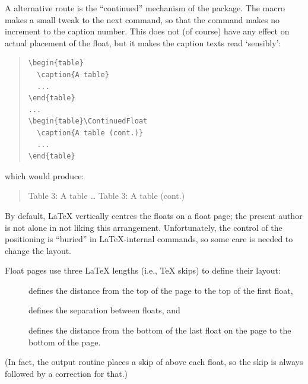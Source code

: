 A alternative route is the ``continued'' mechanism of the
 package.  The  macro makes a
small tweak to the next  command, so that the command
makes no increment to the caption number.  This does not (of course)
have any effect on actual placement of the float, but it makes the
caption texts read `sensibly':
\begin{quote}
\begin{verbatim}
\begin{table}
  \caption{A table}
  ...
\end{table}
...
\begin{table}\ContinuedFloat
  \caption{A table (cont.)}
  ...
\end{table}
\end{verbatim}
\end{quote}
which would produce:
\begin{quote}
  Table 3: A table
  \dots
  Table 3: A table (cont.)
\end{quote}
\begin{ctanrefs}
\item[caption.sty]
\item[dpfloat.sty]
\item[fltpage.sty]
\end{ctanrefs}


By default, \LaTeX{} vertically centres the floats on a float page;
the present author is not alone in not liking this arrangement.
Unfortunately, the control of the positioning is ``buried'' in
\LaTeX{}-internal commands, so some care is needed to change the
layout.

Float pages use three \LaTeX{} lengths (i.e., \TeX{} skips) to define
their layout:
\begin{description}
\item[\nothtml{\normalfont}] defines the distance from the
  top of the page to the top of the first float,
\item[\nothtml{\normalfont}] defines the separation between
  floats, and
\item[\nothtml{\normalfont}] defines the distance from the
  bottom of the last float on the page to the bottom of the page.
\end{description}
(In fact, the output routine places a skip of  above each float, so
the  skip is always followed by a correction for that.)


